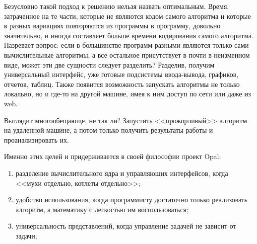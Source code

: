 Безусловно такой подход к решению нельзя назвать оптимальным. Время, затраченное на те части, которые не являются кодом самого алгоритма и которые в разных вариациях повторяются из программы в программу, довольно значительно, и иногда составляет больше времени кодирования самого алгоритма.
Назревает вопрос: если в большинстве программ разными являются только сами вычислительные алгоритмы, а все остальное присутствует в почти в неизменном виде, может эти две сущности следует разделить? Разделив, получим универсальный интерфейс, уже готовые подсистемы ввода-вывода, графиков, отчетов, таблиц. Также появится возможность запускать алгоритмы не только локально, но и где-то на другой машине, имея к ним доступ по сети или даже из web.

Выглядит многообещающе, не так ли? Запустить <<прожорливый>> алгоритм на удаленной машине, а потом только получить результаты работы и проанализировать их.

Именно этих целей и придерживается в своей философии проект Opal:
\begin{enumerate}
\item разделение вычислительного ядра и управляющих интерфейсов, когда <<мухи отдельно, котлеты отдельно>>;
\item удобство использования, когда программисту достаточно только реализовать алгоритм, а математику с легкостью им воспользоваться;
\item универсальность представлений, когда управление задачей не зависит от задачи;
\end{enumerate}
